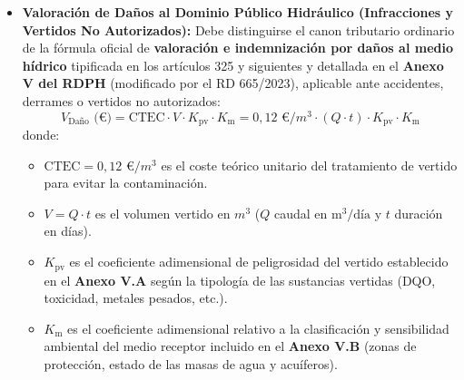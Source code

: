 \documentclass{report}
\begin{document}
\begin{itemize}
    \item \textbf{Valoración de Daños al Dominio Público Hidráulico (Infracciones y Vertidos No Autorizados):} Debe distinguirse el canon tributario ordinario de la fórmula oficial de \textbf{valoración e indemnización por daños al medio hídrico} tipificada en los artículos 325 y siguientes y detallada en el \textbf{Anexo V del RDPH} (modificado por el RD 665/2023), aplicable ante accidentes, derrames o vertidos no autorizados:
    \begin{equation}
        V_{\text{Daño}} \text{ (€)} = \text{CTEC} \cdot V \cdot K_{\text{pv}} \cdot K_{\text{m}} = 0{,}12\text{ €}/\si{m^3} \cdot (Q \cdot t) \cdot K_{\text{pv}} \cdot K_{\text{m}}
        \label{eq:valoracion_danos}
    \end{equation}
    donde:
    \begin{itemize}
        \item $\text{CTEC} = 0{,}12\text{ €}/\si{m^3}$ es el coste teórico unitario del tratamiento de vertido para evitar la contaminación.
        \item $V = Q \cdot t$ es el volumen vertido en $\si{m^3}$ ($Q$ caudal en $\text{m}^3/\text{día}$ y $t$ duración en días).
        \item $K_{\text{pv}}$ es el coeficiente adimensional de peligrosidad del vertido establecido en el \textbf{Anexo V.A} según la tipología de las sustancias vertidas (DQO, toxicidad, metales pesados, etc.).
        \item $K_{\text{m}}$ es el coeficiente adimensional relativo a la clasificación y sensibilidad ambiental del medio receptor incluido en el \textbf{Anexo V.B} (zonas de protección, estado de las masas de agua y acuíferos).
    \end{itemize}
\end{itemize}
\end{document}
